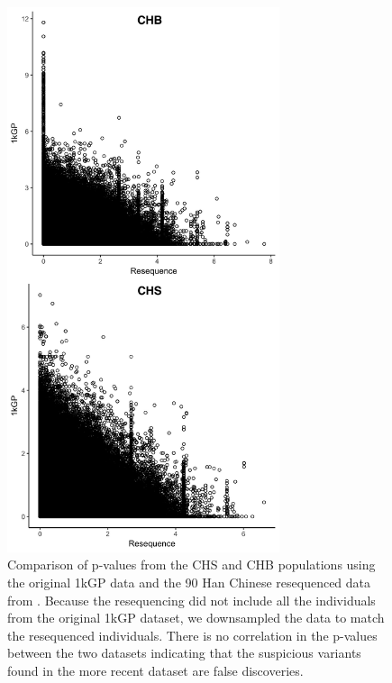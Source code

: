 \documentclass[9pt,lineno]{elife}
\begin{document}
\begin{figure}[h]
\includegraphics[width=8cm,keepaspectratio]{./Figures/ResequencePvals.jpg}
\caption{Comparison of p-values from the CHS and CHB populations using the original 1kGP data and the 90 Han Chinese resequenced data from \citep{Lan2017}.
Because the resequencing did not include all the individuals from the original 1kGP dataset, we downsampled the data to match the resequenced individuals. There is no correlation in the p-values between the two datasets indicating that the suspicious variants found in the more recent dataset are false discoveries.}  
\label{90Han}
\end{figure}
\end{document}
